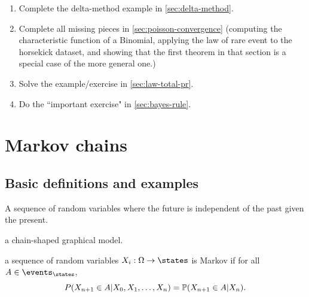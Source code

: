 \documentclass{article}
\begin{document}
\begin{enumerate}	
	\item Complete the delta-method example in \ref{sec:delta-method}. 
	\item Complete all missing pieces in \ref{sec:poisson-convergence} (computing the characteristic function of a Binomial, applying the law of rare event to the horsekick dataset, and showing that the first theorem in that section is a special case of the more general one.)
	\item Solve the example/exercise in \ref{sec:law-total-pr}.
	\item Do the ``important exercise" in \ref{sec:bayes-rule}.
\end{enumerate}


\section{Markov chains}

\subsection{Basic definitions and examples}

 A sequence of random variables where the future is independent of the past given the present. 

 a chain-shaped graphical model.

 a sequence of random variables $X_i : \Omega \to \states$ is Markov if for all $A \in \events_\states$, 
\[ P(X_{n+1} \in A | X_0, X_1, \dots, X_n) = \P(X_{n+1} \in A | X_n). \]
\end{document}
